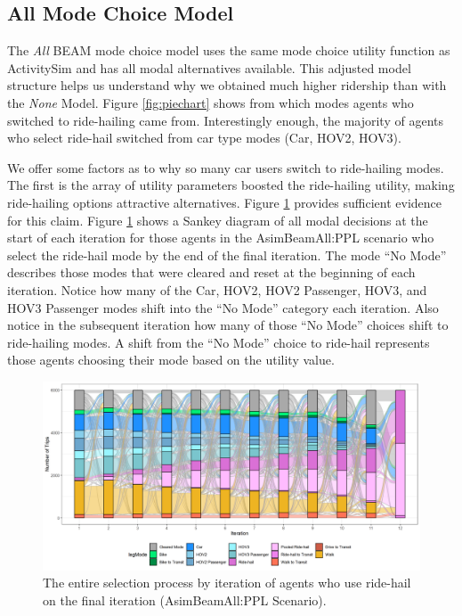 \documentclass[fancy, masters]{byuthesis}
\begin{document}
\hypertarget{type3}{%
\subsection{All Mode Choice Model}\label{type3}}

The \emph{All} BEAM mode choice model uses the same mode choice utility function as ActivitySim and has all modal alternatives available. This adjusted model structure helps us understand why we obtained much higher ridership than with the \emph{None} Model. Figure \ref{fig:piechart} shows from which modes agents who switched to ride-hailing came from. Interestingly enough, the majority of agents who select ride-hail switched from car type modes (Car, HOV2, HOV3).

We offer some factors as to why so many car users switch to ride-hailing modes. The first is the array of utility parameters boosted the ride-hailing utility, making ride-hailing options attractive alternatives. Figure \ref{fig:sankey} provides sufficient evidence for this claim. Figure \ref{fig:sankey} shows a Sankey diagram of all modal decisions at the start of each iteration for those agents in the AsimBeamAll:PPL scenario who select the ride-hail mode by the end of the final iteration. The mode ``No Mode'' describes those modes that were cleared and reset at the beginning of each iteration. Notice how many of the Car, HOV2, HOV2 Passenger, HOV3, and HOV3 Passenger modes shift into the ``No Mode'' category each iteration. Also notice in the subsequent iteration how many of those ``No Mode'' choices shift to ride-hailing modes. A shift from the ``No Mode'' choice to ride-hail represents those agents choosing their mode based on the utility value.

\begin{figure}

\centering
\includegraphics[width = 1.05\paperwidth]{planshifts.png}
\caption{The entire selection process by iteration of agents who use ride-hail on the final iteration (AsimBeamAll:PPL Scenario).}
\label{fig:sankey}

\end{figure}
\end{document}
